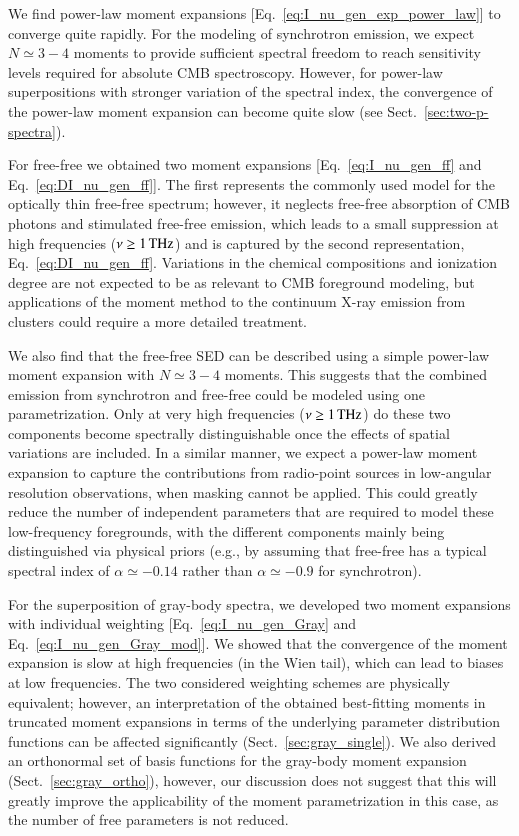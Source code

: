 \documentclass[usenatbib]{mn2e}
\begin{document}
We find power-law moment expansions [Eq.~\eqref{eq:I_nu_gen_exp_power_law}] to converge quite rapidly. For the modeling of synchrotron emission, we expect $N\simeq 3-4$ moments to provide sufficient spectral freedom to reach sensitivity levels required for absolute CMB spectroscopy. However, for power-law superpositions with stronger variation of the spectral index, the convergence of the power-law moment expansion can become quite slow (see Sect.~\ref{sec:two-p-spectra}).

For free-free we obtained two moment expansions [Eq.~\eqref{eq:I_nu_gen_ff} and Eq.~\eqref{eq:DI_nu_gen_ff}]. The first represents the commonly used model for the optically thin free-free spectrum; however, it neglects free-free absorption of CMB photons and stimulated free-free emission, which leads to a small suppression at high frequencies ($\nu\geq 1\,{\rm THz}$) and is captured by the second representation, Eq.~\eqref{eq:DI_nu_gen_ff}. Variations in the chemical compositions and ionization degree are not expected to be as relevant to CMB foreground modeling, but applications of the moment method to the continuum X-ray emission from clusters could require a more detailed treatment.

We also find that the free-free SED can be described using a simple power-law moment expansion with $N\simeq 3-4$ moments. This suggests that the combined emission from synchrotron and free-free could be modeled using one parametrization. Only at very high frequencies ($\nu\geq 1\,{\rm THz}$) do these two components become spectrally distinguishable once the effects of spatial variations are included. In a similar manner, we expect a power-law moment expansion to capture the contributions from radio-point sources in low-angular resolution observations, when masking cannot be applied. This could greatly reduce the number of independent parameters that are required to model these low-frequency foregrounds, with the different components mainly being distinguished via physical priors (e.g., by assuming that free-free has a typical spectral index of $\alpha \simeq -0.14$ rather than $\alpha\simeq -0.9$ for synchrotron).

For the superposition of gray-body spectra, we developed two moment expansions with individual weighting [Eq.~\eqref{eq:I_nu_gen_Gray} and Eq.~\eqref{eq:I_nu_gen_Gray_mod}]. We showed that the convergence of the moment expansion is slow at high frequencies (in the Wien tail), which can lead to biases at low frequencies. The two considered weighting schemes are physically equivalent; however, an interpretation of the obtained best-fitting moments in truncated moment expansions in terms of the underlying parameter distribution functions can be affected significantly (Sect.~\ref{sec:gray_single}). We also derived an orthonormal set of basis functions for the gray-body moment expansion (Sect.~\ref{sec:gray_ortho}), however, our discussion does not suggest that this will greatly improve the applicability of the moment parametrization in this case, as the number of free parameters is not reduced.
\end{document}
